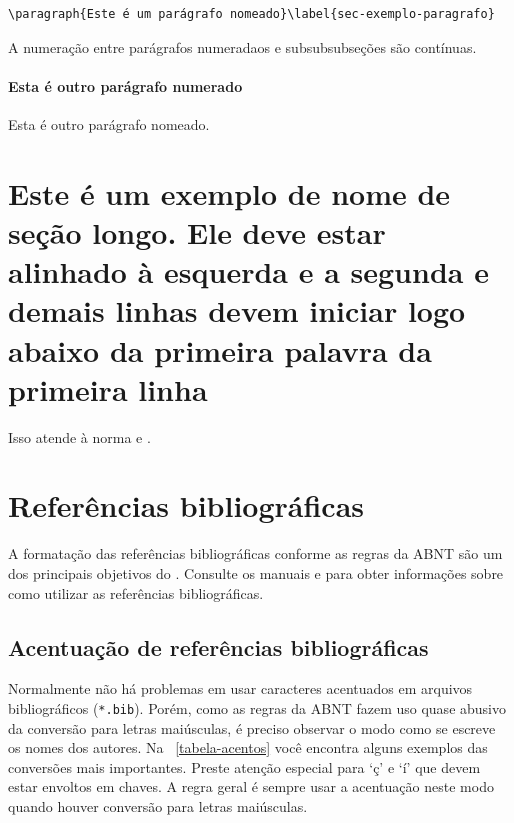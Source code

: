 \documentclass[
	12pt,				%
	openright,			%
	oneside,			    %
	a4paper,				%
	english,			%
	french,			%
	spanish,			%
	brazil			%
	]{abntex2}
\begin{document}
\begin{verbatim}
\paragraph{Este é um parágrafo nomeado}\label{sec-exemplo-paragrafo}
\end{verbatim}

A numeração entre parágrafos numeradaos e subsubsubseções são contínuas.

\paragraph{Esta é outro parágrafo numerado}\label{sec-exemplo-paragrafo-outro}

Esta é outro parágrafo nomeado.

\section{Este é um exemplo de nome de seção longo. Ele deve estar
alinhado à esquerda e a segunda e demais linhas devem iniciar logo abaixo da
primeira palavra da primeira linha}

Isso atende à norma  
 e .


\section{Referências bibliográficas}

A formatação das referências bibliográficas conforme as regras da ABNT são um
dos principais objetivos do \abnTeX. Consulte os manuais
 e  para obter informações
sobre como utilizar as referências bibliográficas.

\subsection{Acentuação de referências bibliográficas}

Normalmente não há problemas em usar caracteres acentuados em arquivos
bibliográficos (\texttt{*.bib}). Porém, como as regras da ABNT fazem uso quase
abusivo da conversão para letras maiúsculas, é preciso observar o modo como se
escreve os nomes dos autores. Na ~\autoref{tabela-acentos} você encontra alguns
exemplos das conversões mais importantes. Preste atenção especial para `ç' e `í'
que devem estar envoltos em chaves. A regra geral é sempre usar a acentuação
neste modo quando houver conversão para letras maiúsculas.
\end{document}
